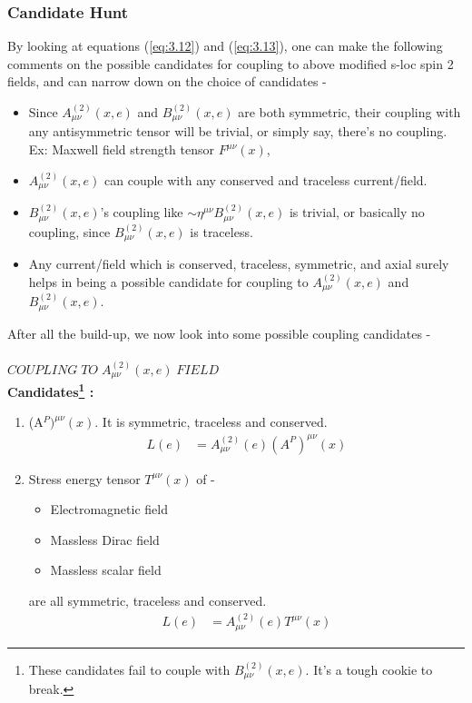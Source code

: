\documentclass[12pt,a4paper]{article}
\numberwithin{equation}{section}
\begin{document}
\subsubsection{Candidate Hunt}
By looking at equations (\ref{eq:3.12}) and (\ref{eq:3.13}), one can make the following comments on the possible candidates for coupling to above modified s-loc spin 2 fields, and can narrow down on the choice of candidates - 
\begin{itemize}
\item
Since $A^{(2)}_{\mu\nu}(x,e)$ and $B^{(2)}_{\mu\nu}(x,e)$ are both symmetric, their coupling with any antisymmetric tensor will be trivial, or simply say, there's no coupling. Ex: Maxwell field strength tensor $F^{\mu\nu}(x)$,\\
\item
$A^{(2)}_{\mu\nu}(x,e)$ can couple with any conserved and traceless current/field. 
\item
$B^{(2)}_{\mu\nu}(x,e)$'s coupling like $\sim\eta^{\mu\nu} B^{(2)}_{\mu\nu}(x,e)$ is trivial, or basically no coupling, since $B^{(2)}_{\mu\nu}(x,e)$ is traceless.    
\item
Any current/field which is conserved, traceless, symmetric, and axial surely helps in being a possible candidate for coupling to $A^{(2)}_{\mu\nu}(x,e)$ and $B^{(2)}_{\mu\nu}(x,e)$.
\end{itemize} 
After all the build-up, we now look into some possible coupling candidates - \\\\
$COUPLING\; TO\; A^{(2)}_{\mu\nu}(x,e)\; FIELD$\\
\textbf{Candidates\footnote{These candidates fail to couple with $B^{(2)}_{\mu\nu}(x,e)$. It's a tough cookie to break.} : } 
\begin{enumerate}
\item
(A$^P)^{\mu\nu}(x)$. It is symmetric, traceless and conserved.
\begin{align}
L(e)&=A^{(2)}_{\mu\nu}(e)(A^P)^{\mu\nu}(x)
\end{align} 
\item
Stress energy tensor $T^{\mu\nu}(x)$ of - 
\begin{itemize}
\item Electromagnetic field
\item Massless Dirac field
\item Massless scalar field
\end{itemize}
are all symmetric, traceless and conserved. 
\begin{align}
L(e)&=A^{(2)}_{\mu\nu}(e)T^{\mu\nu}(x)
\end{align}
\end{enumerate}
\end{document}
